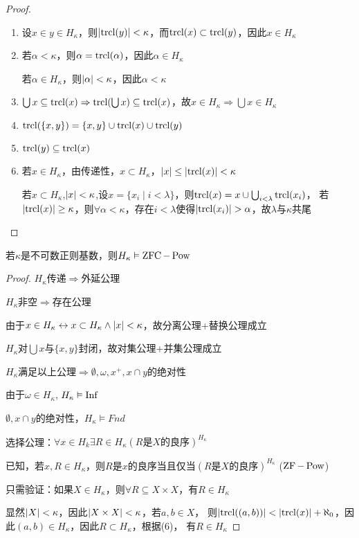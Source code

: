 \documentclass[11pt]{article}
\begin{document}
\begin{proof}
\begin{enumerate}
\item 设\(x\in y\in H_\kappa\)，则\(\abs{\trcl(y)}<\kappa\)，而\(\operatorname{\text{trcl}}(x)\subset\operatorname{\text{trcl}}(y)\)，因此\(x\in H_\kappa\)
\item 若\(\alpha<\kappa\)，则\(\alpha=\operatorname{\text{trcl}}(\alpha)\)，因此\(\alpha\in H_\kappa\)

若\(\alpha\in H_\kappa\)，则\(\abs{\alpha}<\kappa\)，因此\(\alpha<\kappa\)
\item \(\bigcup x\subseteq\operatorname{\text{trcl}}(x)\Rightarrow\operatorname{\text{trcl}}(\bigcup x)\subseteq\operatorname{\text{trcl}}(x)\)，故\(x\in H_\kappa\Rightarrow\bigcup x\in H_\kappa\)
\item \(\operatorname{\text{trcl}}(\{x,y\})=\{x,y\}\cup\operatorname{\text{trcl}}(x)\cup\operatorname{\text{trcl}}(y)\)
\item \(\operatorname{\text{trcl}}(y)\subseteq\operatorname{\text{trcl}}(x)\)
\item 若\(x\in H_\kappa\)，由传递性，\(x\subset H_\kappa\)，\(\abs{x}\le\abs{\trcl(x)}<\kappa\)

若\(x\subset H_\kappa\),\(\abs{x}<\kappa\),设\(x=\{x_i\mid i<\lambda\}\)，则\(\operatorname{\text{trcl}}(x)=x\cup\bigcup_{i<\lambda}\operatorname{\text{trcl}}(x_i)\)，
若\(\abs{\trcl(x)}\ge\kappa\)，则\(\forall\alpha<\kappa\)，存在\(i<\lambda\)使得\(\abs{\trcl(x_i)}>\alpha\)，故\(\lambda\)与\(\kappa\)共尾
\end{enumerate}
\end{proof}

\begin{theorem}[ZFC]
若\(\kappa\)是不可数正则基数，则\(H_\kappa\vDash\operatorname{ZFC}-\operatorname{Pow}\)
\end{theorem}

\begin{proof}
\(H_\kappa\)传递\(\Rightarrow\)外延公理

\(H_\kappa\)非空\(\Rightarrow\)存在公理

由于\(x\in H_\kappa\leftrightarrow x\subset H_\kappa\wedge\abs{x}<\kappa\)，故分离公理+替换公理成立

\(H_\kappa\)对\(\bigcup x\)与\(\{x,y\}\)封闭，故对集公理+并集公理成立

\(H_\kappa\)满足以上公理\(\Rightarrow \emptyset,\omega,x^+,x\cap y\)的绝对性

由于\(\omega\in H_\kappa\), \(H_\kappa\vDash\operatorname{Inf}\)

\(\emptyset,x\cap y\)的绝对性，\(H_\kappa\vDash Fnd\)

选择公理：\(\forall x\in H_k\exists R\in H_\kappa(R\text{是$X$的良序})^{H_\kappa}\)

已知，若\(x,R\in H_\kappa\)，则\(R\)是\(x\)的良序当且仅当\((R\text{是$X$的良序})^{H_\kappa}\) (\(\operatorname{ZF}-\operatorname{Pow}\))

只需验证：如果\(X\in H_\kappa\)，则\(\forall R\subseteq X\times X\)，有\(R\in H_\kappa\)

显然\(\abs{X}<\kappa\)，因此\(\abs{X\times X}<\kappa\)，若\(a,b\in X\)，
则\(\abs{\trcl((a,b))}<\abs{\trcl(x)}+\aleph_0\)，因此\((a,b)\in H_\kappa\)，因此\(R\subset H_\kappa\)，根据(6)，
有\(R\in H_\kappa\)
\end{proof}
\end{document}
